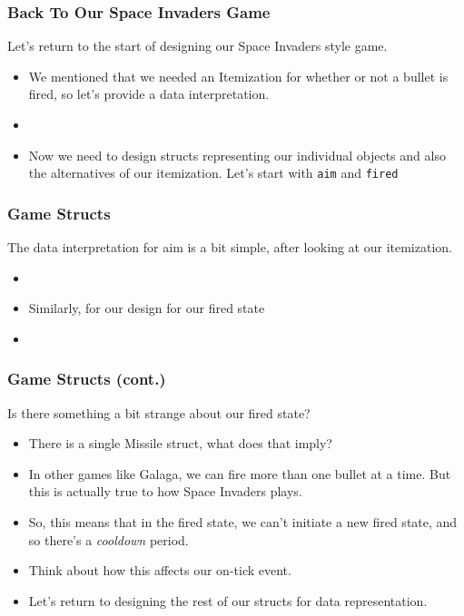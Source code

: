 \documentclass{beamer}
\begin{document}


\begin{frame}
  \frametitle{Back To Our Space Invaders Game}
  Let's return to the start of designing our Space Invaders style game.
  \begin{itemize}
  \item<2-> We mentioned that we needed an Itemization for whether or not
    a bullet is fired, so let's provide a data interpretation.
  \item<3-> \GameState
  \item<4-> Now we need to design structs representing our individual objects
    and also the alternatives of our itemization. Let's start with
    \texttt{aim} and \texttt{fired}
  \end{itemize}
\end{frame}

\begin{frame}
  \frametitle{Game Structs}
  The data interpretation for aim is a bit simple, after looking at our itemization.
  \begin{itemize}
  \item<2-> \AimState
  \item<3-> Similarly, for our design for our fired state
  \item<4-> \FiredState
  \end{itemize}
\end{frame}

\begin{frame}
  \frametitle{Game Structs (cont.)}
  Is there something a bit strange about our fired state?
  \begin{itemize}
  \item<2-> There is a single Missile struct, what does that imply?
  \item<3-> In other games like Galaga, we can fire more than one
    bullet at a time. But this is actually true to how Space Invaders plays.
  \item<4-> So, this means that in the fired state, we can't initiate a new
    fired state, and so there's a \emph{cooldown} period.
  \item<5-> Think about how this affects our on-tick event.
  \item<6-> Let's return to designing the rest of our structs for data
    representation.
  \end{itemize}
\end{frame}
\end{document}
